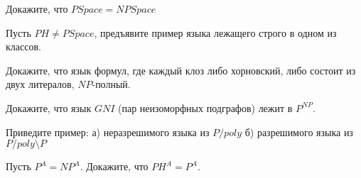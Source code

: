 \setcounter{curtask}{1}


\begin{task}
    Докажите, что $PSpace = NPSpace$
\end{task}

\begin{task}
    Пусть $PH \ne PSpace$, предъявите пример языка лежащего строго в одном из классов.
\end{task}

\begin{task}
	Докажите, что язык формул, где каждый клоз либо хорновский, либо состоит из двух
    литералов, $NP$-полный.
\end{task}

\begin{task}
    Докажите, что язык $GNI$ (пар неизоморфных подграфов) лежит в $P^{NP}$.
\end{task}

\begin{task}
    Приведите пример:
    а) неразрешимого языка из $P/poly$
    б) разрешимого языка из $P/poly \setminus P$
\end{task}

\begin{task}
    Пусть $P^{A} = NP^{A}$. Докажите, что $PH^{A} = P^{A}$.
\end{task}